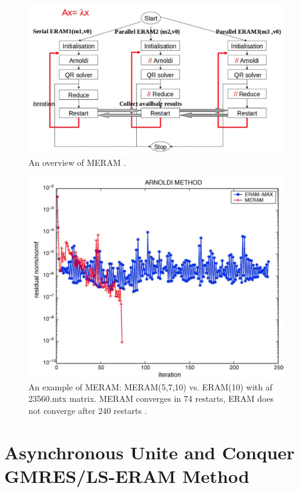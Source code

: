 \begin{figure}[htbp]
	\centering
	\includegraphics[width=6.2in]{fig/meram.png}
	\caption{An overview of MERAM \cite{emad2005multiple}.}
	\label{meram}
\end{figure}

\begin{figure}[htbp]
	\centering
	\includegraphics[width=6.2in]{fig/meram_perf.png}
	\caption{An example of MERAM: MERAM(5,7,10) vs. ERAM(10) with af 23560.mtx matrix. MERAM converges in 74 restarts, ERAM does not converge after 240 restarts \cite{emad2005multiple}.}
	\label{meram-perf}
\end{figure}

\section{Asynchronous Unite and Conquer GMRES/LS-ERAM Method}

